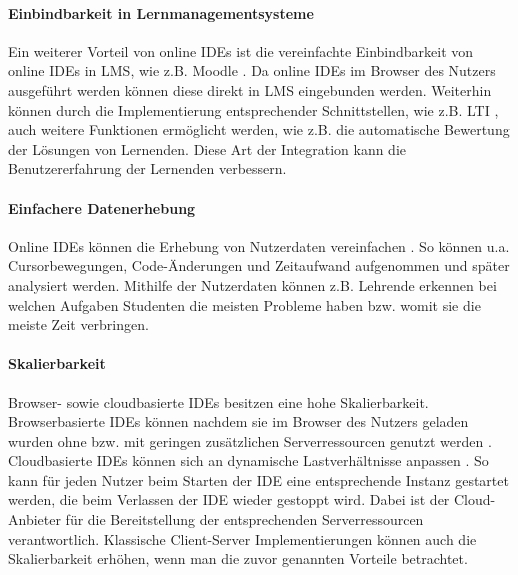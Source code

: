 \paragraph{Einbindbarkeit in Lernmanagementsysteme}
Ein weiterer Vorteil von online IDEs ist die vereinfachte Einbindbarkeit von online IDEs in \ac{LMS}, wie z.B. Moodle \cite{noauthor_moodle_nodate}. Da online IDEs im Browser des Nutzers ausgeführt werden können diese direkt in LMS eingebunden werden. Weiterhin können durch die Implementierung entsprechender Schnittstellen, wie z.B. \ac{LTI} \cite{noauthor_lti_nodate}, auch weitere Funktionen ermöglicht werden, wie z.B. die automatische Bewertung der Lösungen von Lernenden. Diese Art der Integration kann die Benutzererfahrung der Lernenden verbessern.

\paragraph{Einfachere Datenerhebung}
Online IDEs können die Erhebung von Nutzerdaten vereinfachen \cite{efopoulos_wipe_2005}\cite{singh_pyguru_nodate}\cite{helminen_recording_2013}. So können u.a. Cursorbewegungen, Code-Änderungen und Zeitaufwand aufgenommen und später analysiert werden. Mithilfe der Nutzerdaten können z.B. Lehrende erkennen bei welchen Aufgaben Studenten die meisten Probleme haben bzw. womit sie die meiste Zeit verbringen.

\paragraph{Skalierbarkeit}
Browser- sowie cloudbasierte IDEs besitzen eine hohe Skalierbarkeit. Browserbasierte IDEs können nachdem sie im Browser des Nutzers geladen wurden ohne bzw. mit geringen zusätzlichen Serverressourcen genutzt werden \cite{ball_beyond_2015}\cite{jefferson_pyodideu_2024}. Cloudbasierte IDEs können sich an dynamische Lastverhältnisse anpassen \cite{noauthor_azure-cloud-services_nodate}\cite{noauthor_ec2-autoscaling_nodate}. So kann für jeden Nutzer beim Starten der IDE eine entsprechende Instanz gestartet werden, die beim Verlassen der IDE wieder gestoppt wird. Dabei ist der Cloud-Anbieter für die Bereitstellung der entsprechenden Serverressourcen verantwortlich. Klassische Client-Server Implementierungen können auch die Skalierbarkeit erhöhen, wenn man die zuvor genannten Vorteile betrachtet.